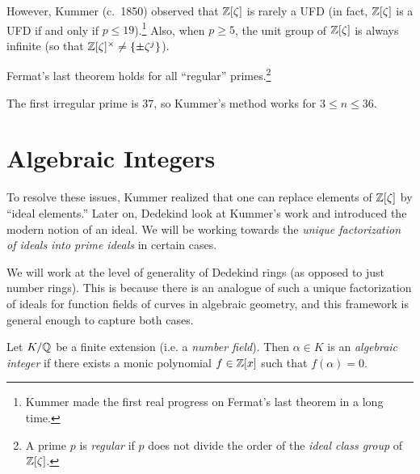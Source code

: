 \begin{remark}
  However, Kummer (c.~1850) observed that $\mathbb{Z}[\zeta]$ is
  rarely a UFD (in fact, $\mathbb{Z}[\zeta]$ is a UFD if and
  only if $p \le 19$).\footnote{Kummer made the first real progress on Fermat's last theorem in a long time.} Also, when
  $p \ge 5$, the unit group of $\mathbb{Z}[\zeta]$ is
  always infinite (so that $\mathbb{Z}[\zeta]^\times \ne \{\pm \zeta^j\}$).
\end{remark}

\begin{theorem}[Kummer]
  Fermat's last theorem holds for all ``regular'' primes.\footnote{A prime $p$ is \emph{regular} if $p$ does not divide the order of the \emph{ideal class group} of $\mathbb{Z}[\zeta]$.}
\end{theorem}

\begin{remark}
  The first irregular prime is $37$, so Kummer's method
  works for $3 \le n \le 36$.
\end{remark}

\section{Algebraic Integers}

\begin{remark}
  To resolve these issues,
  Kummer realized that one can replace elements
  of $\mathbb{Z}[\zeta]$ by ``ideal elements.'' Later on,
  Dedekind look at Kummer's work and introduced
  the modern notion of an ideal. We will be working
  towards the \emph{unique factorization of ideals into
  prime ideals} in certain cases.
\end{remark}

\begin{remark}
  We will work at the level of generality of Dedekind
  rings (as opposed to just number rings). This is
  because there is an analogue of such a unique
  factorization of ideals
  for function fields of curves in algebraic geometry,
  and this framework is general enough to capture
  both cases.
\end{remark}

\begin{definition}
  Let $K / \mathbb{Q}$ be a finite extension (i.e. a \emph{number field}).
  Then $\alpha \in K$ is an \emph{algebraic integer}
  if there exists a monic polynomial $f \in \mathbb{Z}[x]$
  such that $f(\alpha) = 0$.
\end{definition}

